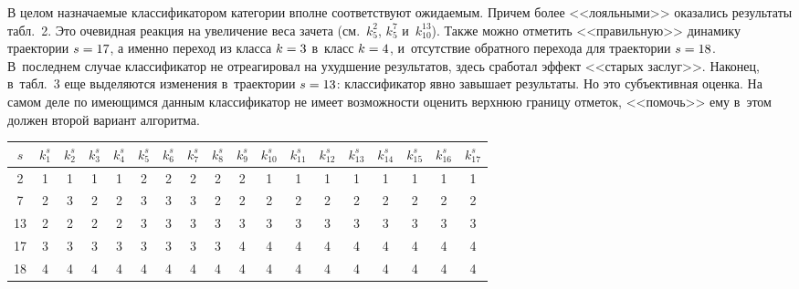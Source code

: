 \begin{multicols}{2}
     В целом назначаемые классификатором категории вполне 
соответствуют ожидаемым. Причем более <<лояльными>> оказались 
результаты табл.~2. Это очевидная реакция на увеличение веса зачета (см.\ 
$k_5^2$, $k_5^7$ и~$k_{10}^{13}$). Также можно отметить <<правильную>> 
динамику траектории $s\hm=17$, а именно переход из класса $k\hm=3$ 
в~класс $k\hm=4$, и~отсутствие обратного перехода для траектории $s\hm=18$. 
В~последнем случае классификатор не отреагировал на ухудшение 
результатов, здесь сработал эффект <<старых заслуг>>. Наконец, в~табл.~3 
еще выделяются изменения в~траектории $s\hm=13$: классификатор явно 
завышает результаты. Но это субъективная оценка. На самом деле по 
имеющимся данным классификатор не имеет возможности оценить верхнюю 
границу отметок, <<помочь>> ему в~этом должен второй вариант алгоритма. 


\begin{table*}[b]\small %
\begin{center}
\vspace*{2ex}

      \begin{tabular}{|c|c|c|c|c|c|c|c|c|c|c|c|c|c|c|c|c|c|}
      \hline
$s$&$k_1^s$&$k_2^s$&$k_3^s$&$k_4^s$&$k_5^s$&$k_6^s$&$k_7^s$&$k_8^s$&$k_9^s$&$k^s_{10}
$&$k^s_{11}$&$k^s_{12}$&$k^s_{13}$&$k^s_{14}$&$k^s_{15}$&$k^s_{16}$&$k_{17}^s$\\
\hline
\hphantom{9}2&1&1&1&1&2&2&2&2&2&1&1&1&1&1&1&1&1\\
\hphantom{9}7&2&3&2&2&3&3&3&2&2&2&2&2&2&2&2&2&2\\
13&2&2&2&2&3&3&3&3&3&3&3&3&3&3&3&3&3\\
17&3&3&3&3&3&3&3&3&4&4&4&4&4&4&4&4&4\\
18&4&4&4&4&4&4&4&4&4&4&4&4&4&4&4&4&4\\
\hline
\end{tabular}
\end{center}
\begin{center}
\vspace*{2ex}


\end{center}
\end{table*}
\end{multicols}
